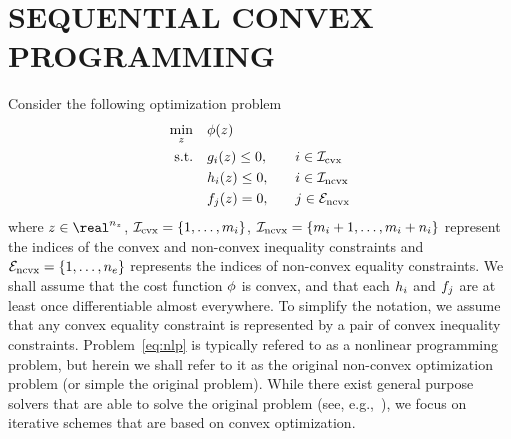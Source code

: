 \documentclass[letterpaper, 10 pt, conference]{ieeeconf}
\begin{document}
\section{SEQUENTIAL CONVEX PROGRAMMING}\label{sec:scp}


Consider the following optimization problem
\begin{subequations}\label{eq:nlp}
\begin{align}
\min_z &\quad \ocost(\z) &&\null \label{eq:nlp_a} \\
\text{s.t.} &\quad \fc_i(\z) \leq 0, &&\quad i \in \setIcvx \label{eq:nlp_b}\\
&\quad \fni_i (\z) \leq 0, &&\quad i \in \setIncvx \label{eq:nlp_c} \\
&\quad \fne_j(\z) = 0, &&\quad j \in \setEncvx \label{eq:nlp_d}
\end{align}
\end{subequations}
where $\z\in\real^{\nz}$, $\mathcal{I}_{\text{cvx}} = \{1,\ldots,m_i\}$, $\mathcal{I}_{\text{ncvx}}=\{m_i+1,\ldots,m_i+n_i\}$ represent the indices of the convex and non-convex inequality constraints and $\mathcal{E}_{\text{ncvx}}=\{1,\ldots,n_e\}$ represents the indices of non-convex equality constraints. We shall assume that the cost function $\phi$ is convex, and that each $h_i$ and $f_j$ are at least once differentiable almost everywhere. To simplify the notation, we assume that any convex equality constraint is represented by a pair of convex inequality constraints. Problem~\eqref{eq:nlp} is typically refered to as a nonlinear programming problem, but herein we shall refer to it as the original non-convex optimization problem (or simple the original problem). While there exist general purpose solvers that are able to solve the original problem (see, e.g.,~\cite{Gill1981,NocedalWright}), we focus on iterative schemes that are based on convex optimization. 
\end{document}
